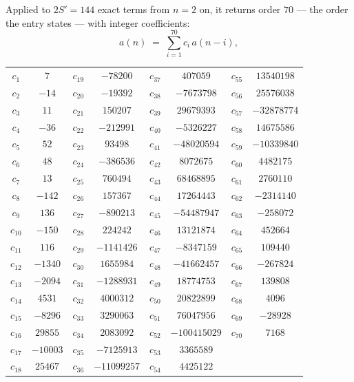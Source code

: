 \documentclass[11pt,a4paper]{article}
\theoremstyle{plain}
\theoremstyle{definition}
\begin{document}
Applied to $2S'=144$ exact terms from $n=2$ on, it returns order $70$ --- the
order the entry states --- with integer coefficients:
\[
a(n)\;=\;\sum_{i=1}^{70}c_i\,a(n-i),
\]
\begin{center}\small
\begin{tabular}{cccccccc}
$c_{1}$ & $7$ & $c_{19}$ & $-78200$ & $c_{37}$ & $407059$ & $c_{55}$ & $13540198$ \\
$c_{2}$ & $-14$ & $c_{20}$ & $-19392$ & $c_{38}$ & $-7673798$ & $c_{56}$ & $25576038$ \\
$c_{3}$ & $11$ & $c_{21}$ & $150207$ & $c_{39}$ & $29679393$ & $c_{57}$ & $-32878774$ \\
$c_{4}$ & $-36$ & $c_{22}$ & $-212991$ & $c_{40}$ & $-5326227$ & $c_{58}$ & $14675586$ \\
$c_{5}$ & $52$ & $c_{23}$ & $93498$ & $c_{41}$ & $-48020594$ & $c_{59}$ & $-10339840$ \\
$c_{6}$ & $48$ & $c_{24}$ & $-386536$ & $c_{42}$ & $8072675$ & $c_{60}$ & $4482175$ \\
$c_{7}$ & $13$ & $c_{25}$ & $760494$ & $c_{43}$ & $68468895$ & $c_{61}$ & $2760110$ \\
$c_{8}$ & $-142$ & $c_{26}$ & $157367$ & $c_{44}$ & $17264443$ & $c_{62}$ & $-2314140$ \\
$c_{9}$ & $136$ & $c_{27}$ & $-890213$ & $c_{45}$ & $-54487947$ & $c_{63}$ & $-258072$ \\
$c_{10}$ & $-150$ & $c_{28}$ & $224242$ & $c_{46}$ & $13121874$ & $c_{64}$ & $452664$ \\
$c_{11}$ & $116$ & $c_{29}$ & $-1141426$ & $c_{47}$ & $-8347159$ & $c_{65}$ & $109440$ \\
$c_{12}$ & $-1340$ & $c_{30}$ & $1655984$ & $c_{48}$ & $-41662457$ & $c_{66}$ & $-267824$ \\
$c_{13}$ & $-2094$ & $c_{31}$ & $-1288931$ & $c_{49}$ & $18774753$ & $c_{67}$ & $139808$ \\
$c_{14}$ & $4531$ & $c_{32}$ & $4000312$ & $c_{50}$ & $20822899$ & $c_{68}$ & $4096$ \\
$c_{15}$ & $-8296$ & $c_{33}$ & $3290063$ & $c_{51}$ & $76047956$ & $c_{69}$ & $-28928$ \\
$c_{16}$ & $29855$ & $c_{34}$ & $2083092$ & $c_{52}$ & $-100415029$ & $c_{70}$ & $7168$ \\
$c_{17}$ & $-10003$ & $c_{35}$ & $-7125913$ & $c_{53}$ & $3365589$ &  &  \\
$c_{18}$ & $25467$ & $c_{36}$ & $-11099257$ & $c_{54}$ & $4425122$ &  &  \\
\end{tabular}
\end{center}
\end{document}

